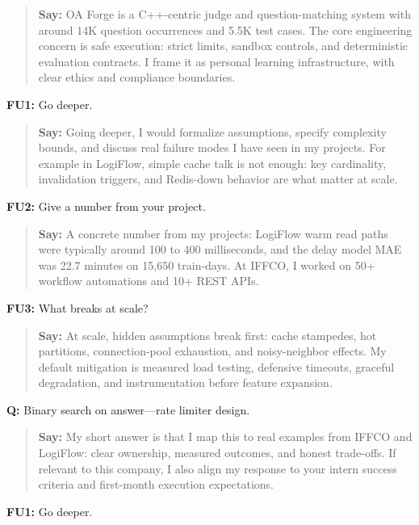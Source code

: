 \documentclass[9pt,a4paper]{article}
\begin{document}
\begin{quote}\small\textbf{Say:} OA Forge is a C++-centric judge and question-matching system with around 14K question occurrences and 5.5K test cases. The core engineering concern is safe execution: strict limits, sandbox controls, and deterministic evaluation contracts. I frame it as personal learning infrastructure, with clear ethics and compliance boundaries.\end{quote}
\vspace{2mm}
\textbf{FU1:} Go deeper.

\begin{quote}\small\textbf{Say:} Going deeper, I would formalize assumptions, specify complexity bounds, and discuss real failure modes I have seen in my projects. For example in LogiFlow, simple cache talk is not enough: key cardinality, invalidation triggers, and Redis-down behavior are what matter at scale.\end{quote}
\vspace{2mm}
\textbf{FU2:} Give a number from your project.

\begin{quote}\small\textbf{Say:} A concrete number from my projects: LogiFlow warm read paths were typically around 100 to 400 milliseconds, and the delay model MAE was 22.7 minutes on 15,650 train-days. At IFFCO, I worked on 50+ workflow automations and 10+ REST APIs.\end{quote}
\vspace{2mm}
\textbf{FU3:} What breaks at scale?

\begin{quote}\small\textbf{Say:} At scale, hidden assumptions break first: cache stampedes, hot partitions, connection-pool exhaustion, and noisy-neighbor effects. My default mitigation is measured load testing, defensive timeouts, graceful degradation, and instrumentation before feature expansion.\end{quote}
\vspace{2mm}
\textbf{Q:} Binary search on answer---rate limiter design.

\begin{quote}\small\textbf{Say:} My short answer is that I map this to real examples from IFFCO and LogiFlow: clear ownership, measured outcomes, and honest trade-offs. If relevant to this company, I also align my response to your intern success criteria and first-month execution expectations.\end{quote}
\vspace{2mm}
\textbf{FU1:} Go deeper.
\end{document}
